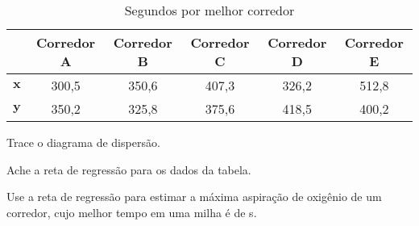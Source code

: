 \documentclass{ativmatUFRB}
\begin{document}
\begin{atividade}
\begin{table}[!htbp] %
 \caption{Segundos por melhor corredor} %
 \label{tab:corredor} %
 \centering %
 \begin{tabular}{l c c c c c} %
  \toprule %
                & \textbf{Corredor A} & \textbf{Corredor B} & \textbf{Corredor C} & \textbf{Corredor D} & \textbf{Corredor E}\\
  \midrule %
   $\mathbf{x}$ & 300,5               & 350,6               & 407,3               & 326,2               & 512,8\\
   $\mathbf{y}$ & 350,2               & 325,8               & 375,6               & 418,5               & 400,2\\
  \bottomrule %
 \end{tabular}
\end{table}
	
\begin{itens}
 \item Trace o diagrama de dispersão.
 \item Ache a reta de regressão para os dados da tabela.
 \item Use a reta de regressão para estimar a máxima aspiração de oxigênio de um
  corredor, cujo melhor tempo em uma milha é de \unit[340,4]{s}. %
\end{itens}



\end{atividade}
\end{document}
